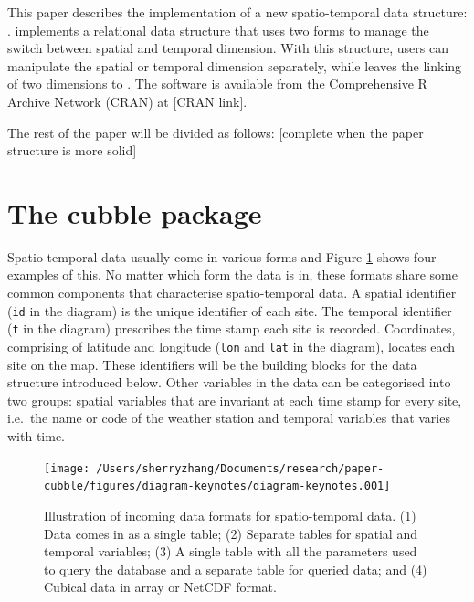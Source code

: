 \documentclass[
]{jss}
\begin{document}
This paper describes the implementation of a new spatio-temporal data
structure: .  implements a relational data
structure that uses two forms to manage the switch between spatial and
temporal dimension. With this structure, users can manipulate the
spatial or temporal dimension separately, while leaves the linking of
two dimensions to . The software is available from the
Comprehensive R Archive Network (CRAN) at {[}CRAN link{]}. \newline

The rest of the paper will be divided as follows: {[}complete when the
paper structure is more solid{]}

\newpage

\hypertarget{the-cubble-package}{%
\section{The cubble package}\label{the-cubble-package}}

Spatio-temporal data usually come in various forms and Figure
\ref{fig:illu-input} shows four examples of this. No matter which form
the data is in, these formats share some common components that
characterise spatio-temporal data. A spatial identifier (\texttt{id} in
the diagram) is the unique identifier of each site. The temporal
identifier (\texttt{t} in the diagram) prescribes the time stamp each
site is recorded. Coordinates, comprising of latitude and longitude
(\texttt{lon} and \texttt{lat} in the diagram), locates each site on the
map. These identifiers will be the building blocks for the data
structure introduced below. Other variables in the data can be
categorised into two groups: spatial variables that are invariant at
each time stamp for every site, i.e.~the name or code of the weather
station and temporal variables that varies with time.

\begin{CodeChunk}
\begin{figure}

{\centering \texttt{[image: /Users/sherryzhang/Documents/research/paper-cubble/figures/diagram-keynotes/diagram-keynotes.001]} 

}

\caption[Illustration of incoming data formats for spatio-temporal data]{Illustration of incoming data formats for spatio-temporal data. (1) Data comes in as a single table; (2) Separate tables for spatial and temporal variables; (3) A single table with all the parameters used to query the database and a separate table for queried data; and (4) Cubical data in array or NetCDF format.}\label{fig:illu-input}
\end{figure}
\end{CodeChunk}
\end{document}
